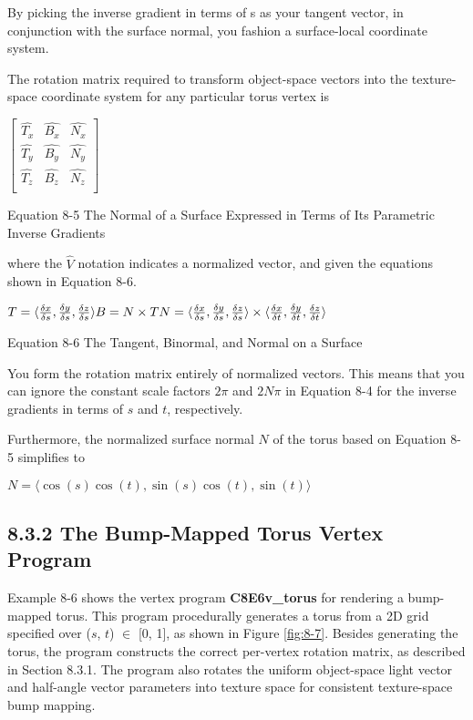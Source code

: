 \documentclass[../main.tex]{subfiles}
\begin{document}
By picking the inverse gradient in terms of s as your tangent vector, in conjunction with the surface normal, you fashion a surface-local coordinate system.

The rotation matrix required to transform object-space vectors into the texture-space coordinate system for any particular torus vertex is

\FloatBarrier
\begin{equationcaption}
$
\begin{bmatrix}
\hat{T_x} & \hat{B_x} & \hat{N_x} \\
\hat{T_y} & \hat{B_y} & \hat{N_y} \\
\hat{T_z} & \hat{B_z} & \hat{N_z} \\
\end{bmatrix}
$
\caption{Equation 8-5 The Normal of a Surface Expressed in Terms of Its Parametric Inverse Gradients}
\end{equationcaption}
\FloatBarrier

where the $\hat{V}$ notation indicates a normalized vector, and given the equations shown in Equation 8-6.

\FloatBarrier
\begin{equationcaption}
$
T=\langle \frac{\delta x}{\delta s},\frac{\delta y}{\delta s},\frac{\delta z}{\delta s}\rangle \newline
B=N\times T \newline
N=\langle \frac{\delta x}{\delta s},\frac{\delta y}{\delta s},\frac{\delta z}{\delta s}\rangle \times \langle \frac{\delta x}{\delta t},\frac{\delta y}{\delta t},\frac{\delta z}{\delta t}\rangle 
$
\caption{Equation 8-6 The Tangent, Binormal, and Normal on a Surface}
\end{equationcaption}
\FloatBarrier

You form the rotation matrix entirely of normalized vectors. This means that you can ignore the constant scale factors $2\pi$ and $2N\pi$ in Equation 8-4 for the inverse gradients in terms of $s$ and $t$, respectively.

Furthermore, the normalized surface normal $N$ of the torus based on Equation 8-5 simplifies to

$
N=\langle \cos(s)\cos(t),\sin(s)\cos(t),\sin(t)\rangle
$

\subsection{8.3.2 The Bump-Mapped Torus Vertex Program}

Example 8-6 shows the vertex program \textbf{C8E6v_torus} for rendering a bump-mapped torus. This program procedurally generates a torus from a 2D grid specified over ($s$, $t$) $\in$ [0, 1], as shown in Figure \ref{fig:8-7}. Besides generating the torus, the program constructs the correct per-vertex rotation matrix, as described in Section 8.3.1. The program also rotates the uniform object-space light vector and half-angle vector parameters into texture space for consistent texture-space bump mapping.
\end{document}
